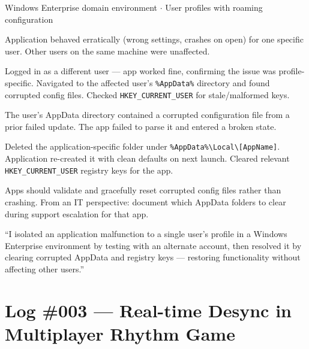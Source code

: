\documentclass[11pt, letterpaper]{article}
\begin{document}
\begin{tcolorbox}[colback=logbg, colframe=logborder, arc=3pt, boxrule=1pt]
\begin{description}[noitemsep, leftmargin=2cm, style=nextline]
  \item[\textbf{Stack}] Windows Enterprise domain environment $\cdot$ User profiles with roaming configuration
  \item[\textbf{Symptom}] Application behaved erratically (wrong settings, crashes on open) for one specific user. Other users on the same machine were unaffected.
  \item[\textbf{Diagnosis}] Logged in as a different user --- app worked fine, confirming the issue was profile-specific. Navigated to the affected user's \texttt{\%AppData\%} directory and found corrupted config files. Checked \texttt{HKEY\_CURRENT\_USER} for stale/malformed keys.
  \item[\textbf{Root Cause}] The user's AppData directory contained a corrupted configuration file from a prior failed update. The app failed to parse it and entered a broken state.
  \item[\textbf{Fix}] Deleted the application-specific folder under \texttt{\%AppData\%\textbackslash Local\textbackslash [AppName]}. Application re-created it with clean defaults on next launch. Cleared relevant \texttt{HKEY\_CURRENT\_USER} registry keys for the app.
  \item[\textbf{Prevention}] Apps should validate and gracefully reset corrupted config files rather than crashing. From an IT perspective: document which AppData folders to clear during support escalation for that app.
  \item[\textbf{STAR summary}] ``I isolated an application malfunction to a single user's profile in a Windows Enterprise environment by testing with an alternate account, then resolved it by clearing corrupted AppData and registry keys --- restoring functionality without affecting other users.''
\end{description}
\end{tcolorbox}

\section*{Log \#003 --- Real-time Desync in Multiplayer Rhythm Game}
\end{document}
